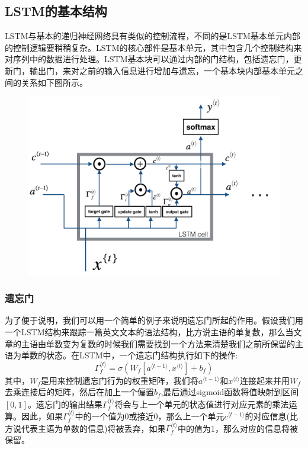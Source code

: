\documentclass{ctexart}
\begin{document}
\subsection{LSTM的基本结构}
LSTM与基本的递归神经网络具有类似的控制流程，不同的是LSTM基本单元内部的控制逻辑要稍稍复杂。LSTM的核心部件是基本单元，其中包含几个控制结构来对序列中的数据进行处理。LSTM基本块可以通过内部的门结构，包括遗忘门，更新门，输出门，来对之前的输入信息进行增加与遗忘，一个基本块内部基本单元之间的关系如下图所示。
\begin{figure}[htb!]
	\centering
	\includegraphics[scale=0.8]{LSTM.png}
\end{figure}
\subsubsection{遗忘门}
为了便于说明，我们可以用一个简单的例子来说明遗忘门所起的作用。假设我们用一个LSTM结构来跟踪一篇英文文本的语法结构，比方说主语的单复数，那么当文章的主语由单数变为复数的时候我们需要找到一个方法来清楚我们之前所保留的主语为单数的状态。在LSTM中，一个遗忘门结构执行如下的操作:
\begin{equation*}
\Gamma_f^{\langle t \rangle} = \sigma(W_f[a^{\langle t-1 \rangle}, x^{\langle t \rangle}] + b_f)
\end{equation*}
其中，$W_f$是用来控制遗忘门行为的权重矩阵，我们将$a^{\langle t-1 \rangle}$和$x^{\langle t \rangle}$连接起来并用$W_f$去乘连接后的矩阵，然后在加上一个偏置$b_f$,最后通过sigmoid函数将值映射到区间$[0,1]$。遗忘门的输出结果$\Gamma_f^{\langle t \rangle}$将会与上一个单元的状态值进行对应元素的乘法运算。因此，如果$\Gamma_f^{\langle t \rangle}$中的一个值为0或接近0，那么上一个单元$c^{\langle t-1 \rangle}$的对应信息(比方说代表主语为单数的信息)将被丢弃，如果$\Gamma_f^{\langle t \rangle}$中的值为1，那么对应的信息将被保留。
\end{document}
